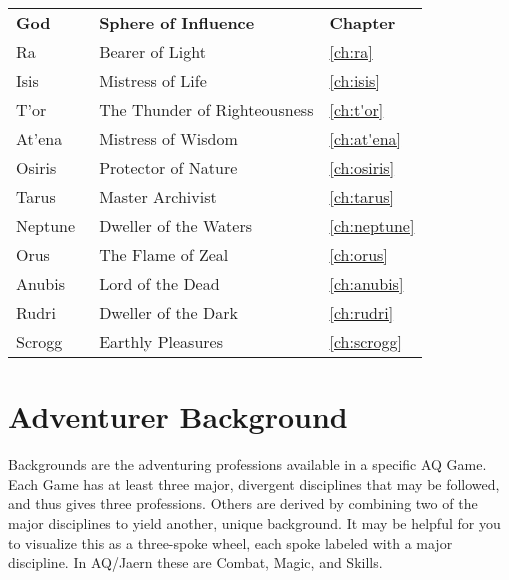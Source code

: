 \begin{normbox}
\small
\begin{tabular}{@{}l l l}

\textbf{God} & \textbf{Sphere of Influence} & \textbf{Chapter}\\
Ra & Bearer of Light & \ref{ch:ra}\\
Isis\ & Mistress of Life & \ref{ch:isis}\\
T'or\ & The Thunder of Righteousness & \ref{ch:t'or}\\
At'ena\ & Mistress of Wisdom & \ref{ch:at'ena}\\
Osiris\ & Protector of Nature & \ref{ch:osiris}\\
Tarus\ & Master Archivist & \ref{ch:tarus}\\
Neptune\ & Dweller of the Waters & \ref{ch:neptune}\\
Orus\ & The Flame of Zeal & \ref{ch:orus}\\
Anubis\ & Lord of the Dead & \ref{ch:anubis}\\
Rudri\ & Dweller of the Dark & \ref{ch:rudri}\\
Scrogg\ & Earthly Pleasures & \ref{ch:scrogg}\\
\end{tabular}
\end{normbox}
\normalsize

\section{Adventurer Background}
Backgrounds are the adventuring professions available in a specific AQ Game. Each Game has at least three major, divergent disciplines that may be followed, and thus gives three professions. Others are derived by combining two of the major disciplines to yield another, unique background. It may be helpful for you to visualize this as a three-spoke wheel, each spoke labeled with a major discipline. In AQ/Jaern these are Combat, Magic, and Skills.

